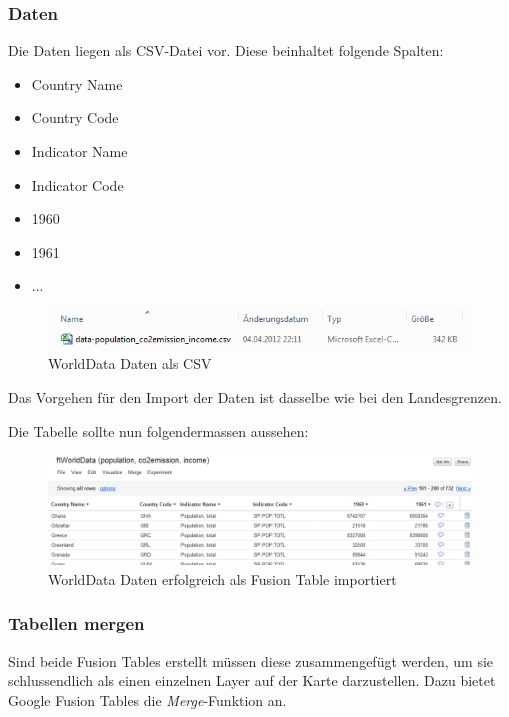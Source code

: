 \subsubsection{Daten}
Die Daten liegen als CSV-Datei vor. Diese beinhaltet folgende Spalten:
\begin{itemize}
\item Country Name
\item Country Code
\item Indicator Name
\item Indicator Code
\item 1960
\item 1961
\item ...
\end{itemize}

\begin{figure}[!h]
	\centering
	\includegraphics{images/usecase1-worlddata/worlddata-data_csv.png}
	\caption{WorldData Daten als CSV}
	\label{worlddata-data_csv}
\end{figure}

Das Vorgehen für den Import der Daten ist dasselbe wie bei den Landesgrenzen.

Die Tabelle sollte nun folgendermassen aussehen:

\begin{figure}[!h]
	\centering
	\includegraphics[scale=0.5]{images/usecase1-worlddata/worlddata-data_import_done.png}
	\caption{WorldData Daten erfolgreich als Fusion Table importiert}
	\label{worlddata-data_import_done}
\end{figure}

\subsubsection{Tabellen mergen}
Sind beide Fusion Tables erstellt müssen diese zusammengefügt werden, um sie schlussendlich als einen einzelnen Layer auf der Karte darzustellen. Dazu bietet Google Fusion Tables die \emph{Merge}-Funktion an. 

